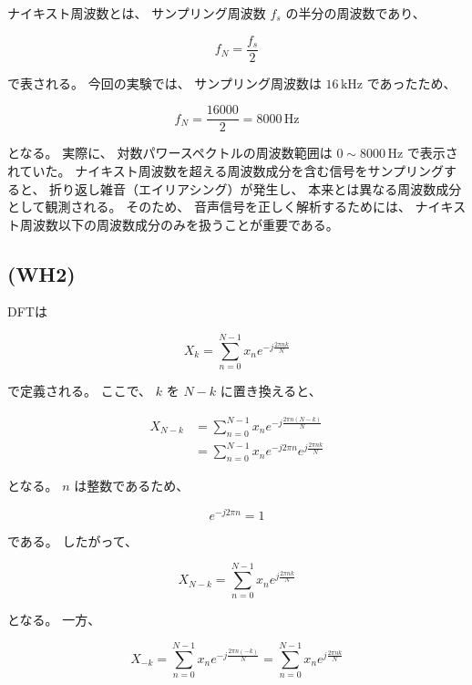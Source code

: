 \documentclass{jsarticle}
\begin{document}
ナイキスト周波数とは、
サンプリング周波数 $f_s$ の半分の周波数であり、

\begin{equation}
f_N=\frac{f_s}{2}
\end{equation}

で表される。
今回の実験では、
サンプリング周波数は $16\,\mathrm{kHz}$ であったため、

\begin{equation}
f_N=\frac{16000}{2}=8000\,\mathrm{Hz}
\end{equation}

となる。
実際に、
対数パワースペクトルの周波数範囲は
$0\sim8000\,\mathrm{Hz}$ で表示されていた。
ナイキスト周波数を超える周波数成分を含む信号をサンプリングすると、
折り返し雑音（エイリアシング）が発生し、
本来とは異なる周波数成分として観測される。
そのため、
音声信号を正しく解析するためには、
ナイキスト周波数以下の周波数成分のみを扱うことが重要である。
\subsection*{(WH2)}

DFTは

\begin{equation}
X_k=
\sum_{n=0}^{N-1}
x_n e^{-j\frac{2\pi nk}{N}}
\end{equation}

で定義される。
ここで、
$k$ を $N-k$ に置き換えると、

\begin{align}
X_{N-k}
&=
\sum_{n=0}^{N-1}
x_n
e^{-j\frac{2\pi n(N-k)}{N}} \\
&=
\sum_{n=0}^{N-1}
x_n
e^{-j2\pi n}
e^{j\frac{2\pi nk}{N}}
\end{align}

となる。
$n$ は整数であるため、

\begin{equation}
e^{-j2\pi n}=1
\end{equation}

である。
したがって、

\begin{equation}
X_{N-k}
=
\sum_{n=0}^{N-1}
x_n
e^{j\frac{2\pi nk}{N}}
\end{equation}

となる。
一方、

\begin{equation}
X_{-k}
=
\sum_{n=0}^{N-1}
x_n
e^{-j\frac{2\pi n(-k)}{N}}
=
\sum_{n=0}^{N-1}
x_n
e^{j\frac{2\pi nk}{N}}
\end{equation}
\end{document}
